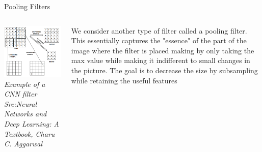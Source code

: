 \begin{frame}{Pooling Filters}
	\begin{columns}[T]
        \begin{column}{0.5\textwidth}
        	\includegraphics[width=\textwidth]{images/CNN_pool.png}
			\tiny{\textit{Example of a CNN filter\\Src:Neural Networks and Deep Learning: A Textbook, Charu C. Aggarwal }}
        \end{column}
		\begin{column}{0.5\textwidth}
	    We consider another type of filter called a pooling filter. This essentially captures the "essence" of the part of the image where the filter is placed making by only taking the max value while making it indifferent to small changes in the picture. The goal is to decrease the size by subsampling while retaining the useful features
		
		\end{column} 
    \end{columns}
\end{frame}


